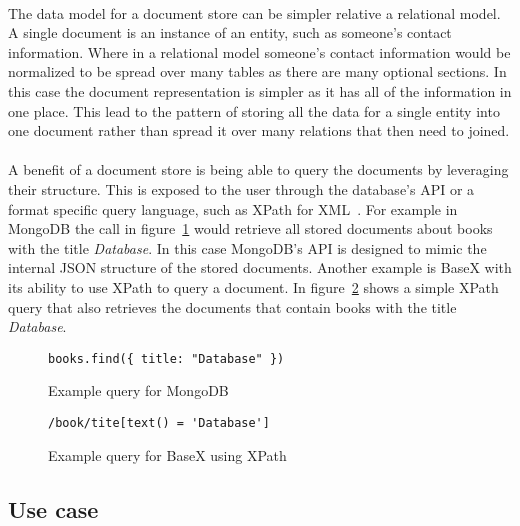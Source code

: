 \documentclass{CRPITStyle}
\renewcommand{\cite}{\citep}
\begin{document}
\paragraph{}
The data model for a document store can be simpler relative a relational model.
A single document is an instance of an entity, such as someone's contact information.
Where in a relational model someone's contact information would be
normalized to be spread over many tables as there are many optional sections.
In this case the document representation is simpler as it has all of the
information in one place.
This lead to the pattern of storing all the data for a single entity into
one document rather than spread it over many relations that then need to
joined.

\paragraph{}
A benefit of a document store is being able to query the documents
by leveraging their structure.
This is exposed to the user through the database's API or a format specific
query language, such as XPath for XML~\cite{xpath}.
For example in MongoDB the call in figure~\ref{lst:mongo} would retrieve all
stored documents about books with the title \textit{Database}.
In this case MongoDB's API is designed to mimic the internal JSON structure 
of the stored documents.
Another example is BaseX with its ability to use XPath to query a document.
In figure~\ref{lst:basex} shows a simple XPath query that also retrieves
the documents that contain books with the title \textit{Database}.

\begin{figure}
\begin{verbatim}
books.find({ title: "Database" })
\end{verbatim}
\caption{Example query for MongoDB}
\label{lst:mongo}
\end{figure}

\begin{figure}
\begin{verbatim}
/book/tite[text() = 'Database']
\end{verbatim}
\caption{Example query for BaseX using XPath}
\label{lst:basex}
\end{figure}

\subsection{Use case}
\end{document}

